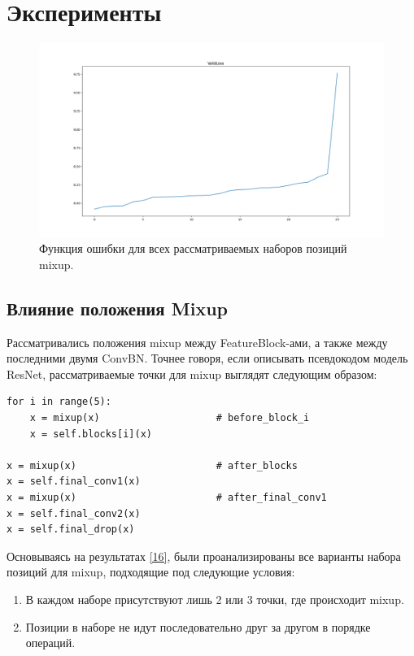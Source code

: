\section{Эксперименты}
\label{sec:Chapter4} 

\begin{figure}
    \centering
    \includegraphics[scale=0.4]{./images/mixup_position/all/ValidLoss.png}
    \caption{\protect\hypertarget{image13}{Функция ошибки для всех рассматриваемых наборов позиций mixup.}}
\end{figure}

\subsection{Влияние положения Mixup}
Рассматривались положения mixup между FeatureBlock-ами, а также между последними двумя ConvBN. Точнее говоря, если описывать псевдокодом модель ResNet, рассматриваемые точки для mixup выглядят следующим образом:

\begin{lstlisting}
for i in range(5):
    x = mixup(x)                    # before_block_i
    x = self.blocks[i](x)

x = mixup(x)                        # after_blocks
x = self.final_conv1(x)
x = mixup(x)                        # after_final_conv1
x = self.final_conv2(x)
x = self.final_drop(x)
\end{lstlisting}

Основываясь на результатах \hyperlink{cite.Bas19}{[16]}, были проанализированы все варианты набора позиций для mixup, подходящие под следующие условия:
\begin{enumerate}
\item В каждом наборе присутствуют лишь 2 или 3 точки, где происходит mixup.
\item Позиции в наборе не идут последовательно друг за другом в порядке операций.
\end{enumerate}

